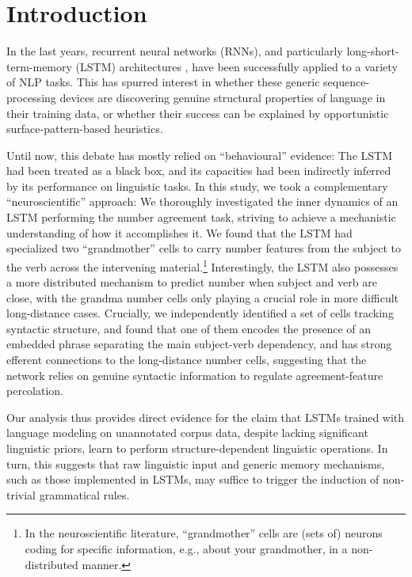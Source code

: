 \section{Introduction}

In the last years, recurrent neural networks (RNNs), and particularly
long-short-term-memory (LSTM) architectures
\cite{Hochreiter:Schmidhuber:1997}, have been successfully applied to
a variety of NLP tasks. This has spurred interest in whether these
generic sequence-processing devices are discovering genuine structural
properties of language in their training data, or whether their
success can be explained by opportunistic surface-pattern-based
heuristics.

Until now, this debate has mostly relied on ``behavioural'' evidence:
The LSTM had been treated as a black box, and its capacities had been indirectly
inferred by its performance on linguistic tasks. In this study, we took a
complementary ``neuroscientific'' approach: We thoroughly investigated
the inner dynamics of an LSTM performing the number agreement task,
striving to achieve a mechanistic understanding of how it accomplishes
it. We found that the LSTM had specialized two ``grandmother'' cells
\cite{Bowers:2009} to carry number features from the subject to the
verb across the intervening material.\footnote{In the neuroscientific
  literature, ``grandmother'' cells are (sets of) neurons coding for
  specific information, e.g., about your grandmother, in a
  non-distributed manner.} Interestingly, the LSTM also
possesses a more distributed mechanism to predict number when subject
and verb are close, with the grandma number cells only playing a
crucial role in more difficult long-distance cases. Crucially, we
independently identified a set of cells tracking syntactic structure,
and found that one of them encodes the presence of an embedded phrase
separating the main subject-verb dependency, and has strong efferent
connections to the long-distance number cells, suggesting that the
network relies on genuine syntactic information to regulate
agreement-feature percolation.

Our analysis thus provides direct evidence for the claim that LSTMs
trained with language modeling on unannotated corpus data, despite
lacking significant linguistic priors, learn to perform
structure-dependent linguistic operations. In turn, this suggests that
raw linguistic input and generic memory mechanisms, such as those
implemented in LSTMs, may suffice to trigger the induction of
non-trivial grammatical rules.